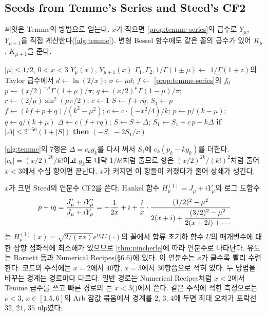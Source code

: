 \subsection{Seeds from Temme's Series and Steed's CF2}

씨앗은 Temme의 방법\cite{temme1975bessel,press2007nr}으로 얻는다. $x$가 작으면 \cref{prop:temme-series}의 급수로 $Y_\mu$, $Y_{\mu+1}$을 직접 계산한다(\cref{alg:temme}). 변형 Bessel 함수에도 같은 꼴의 급수가 있어 $K_\mu$, $K_{\mu+1}$을 준다.

\begin{algorithm}[htbp]
\begin{algorithmic}[1]
\Require $|\mu|\le1/2$, $0<x<3$
\Ensure $Y_\mu(x)$, $Y_{\mu+1}(x)$
\State $\Gamma_1,\Gamma_2,1/\Gamma(1\pm\mu)\gets$ $1/\Gamma(1+z)$의 Taylor 급수에서 
\State $d\gets\ln(2/x)$; $\sigma\gets\mu d$; $f\gets$ \cref{prop:temme-series}의 $f_0$ 
\State $p\gets(x/2)^{-\mu}\Gamma(1+\mu)/\pi$; $q\gets(x/2)^\mu\Gamma(1-\mu)/\pi$; $r\gets(2/\mu)\sin^2(\mu\pi/2)$; $c\gets1$
\State $S\gets f+rq$; $S_1\gets p$
  \State $f\gets(kf+p+q)/(k^2-\mu^2)$; $c\gets c\cdot(-x^2/4)/k$; $p\gets p/(k-\mu)$; $q\gets q/(k+\mu)$
  \State $\Delta\gets c(f+rq)$; $S\gets S+\Delta$; $S_1\gets S_1+c\,p-k\Delta$
  \State \textbf{if} $|\Delta|\le2^{-56}(1+|S|)$ \textbf{then} \Return $(-S,\ -2S_1/x)$
\EndFor
\end{algorithmic}
\caption{Temme의 급수 (stardust 의 )}
\label{alg:temme}
\end{algorithm}

\cref{alg:temme}의 7행은 $\Delta=c_kg_k$를 다시 써서 $S_1$에 $c_k(p_k-kg_k)$를 더한다. $|c_k|=(x/2)^{2k}/k!$이고 $g_k$도 대략 $1/k!$처럼 줄므로 항은 $(x/2)^{2k}/(k!)^2$처럼 줄어 $x<3$에서 수십 항이면 끝난다. $x$가 커지면 이 항들이 커졌다가 줄어 상쇄가 생긴다.

$x$가 크면 Steed의 연분수 CF2\cite{barnett1974}를 쓴다. Hankel 함수 $H^{(1)}_\mu=J_\mu+iY_\mu$의 로그 도함수
\[
p+iq=\frac{J'_\mu+iY'_\mu}{J_\mu+iY_\mu}=-\frac{1}{2x}+i+\frac ix\cdot\cfrac{(1/2)^2-\mu^2}{2(x+i)+\cfrac{(3/2)^2-\mu^2}{2(x+2i)+\cdots}}
\]
는 $H^{(1)}_\mu(x)=\sqrt{2/(\pi x)}e^{i\chi}U(\cdot)$의 꼴에서 합류 초기하 함수 $U$의 매개변수에 대한 삼항 점화식에 최소해가 있으므로 \cref{thm:pincherle}에 따라 연분수로 나타난다. 유도는 Barnett 등\cite{barnett1974}과 Numerical Recipes\cite{press2007nr}(§6.6)에 있다. 이 연분수는 $x$가 클수록 빨리 수렴한다. 코드의 주석에는 $x=2$에서 $40$항, $x=3$에서 $30$항쯤으로 적혀 있다. 두 방법을 바꾸는 경계는 경로마다 다르다. 일반 경로는 Numerical Recipes처럼 $x<2$에서 Temme 급수를 쓰고 빠른 경로의 는 $x<3$()에서 쓴다. 같은 주석에 적힌 측정으로는 $\nu<3$, $x\in[1.5,6]$의 Arb 참값 묶음에서 경계를 $2$, $3$, $4$에 두면 최대 오차가 포락선 $32$, $21$, $35$ ulp였다.

